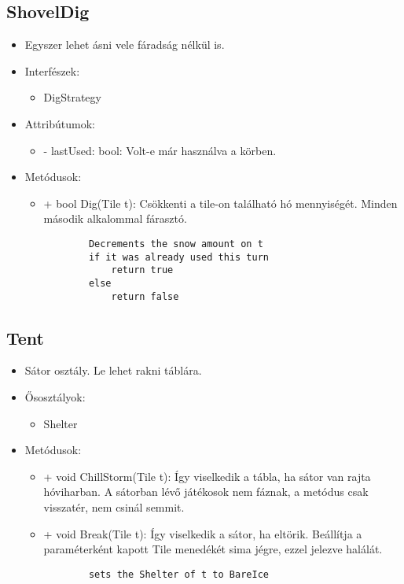 \subsection{ShovelDig}
\begin{itemize}
	\item Egyszer lehet ásni vele fáradság nélkül is.
	\item Interfészek:
	\begin{itemize}
		\item DigStrategy
	\end{itemize}
	\item Attribútumok:
	\begin{itemize}
		\item - lastUsed: bool: Volt-e már használva a körben.
	\end{itemize}
	\item Metódusok:
	\begin{itemize}
		\item + bool Dig(Tile t): Csökkenti a tile-on található hó mennyiségét. Minden második alkalommal fárasztó.
		\begin{lstlisting}
		Decrements the snow amount on t
		if it was already used this turn
			return true
		else 
			return false
		\end{lstlisting}
	\end{itemize}
\end{itemize}

\subsection{Tent}
\begin{itemize}
	\item Sátor osztály. Le lehet rakni táblára.
	\item Ősosztályok:
	\begin{itemize}
		\item Shelter
	\end{itemize}
	\item Metódusok:
	\begin{itemize}
		\item + void ChillStorm(Tile t): Így viselkedik a tábla, ha sátor van rajta hóviharban. A sátorban lévő játékosok nem fáznak, a metódus csak visszatér, nem csinál semmit.
		\item + void Break(Tile t): Így viselkedik a sátor, ha eltörik. Beállítja a paraméterként kapott Tile menedékét sima jégre, ezzel jelezve halálát.
		\begin{lstlisting}
		sets the Shelter of t to BareIce
		\end{lstlisting}
	\end{itemize}
\end{itemize}

